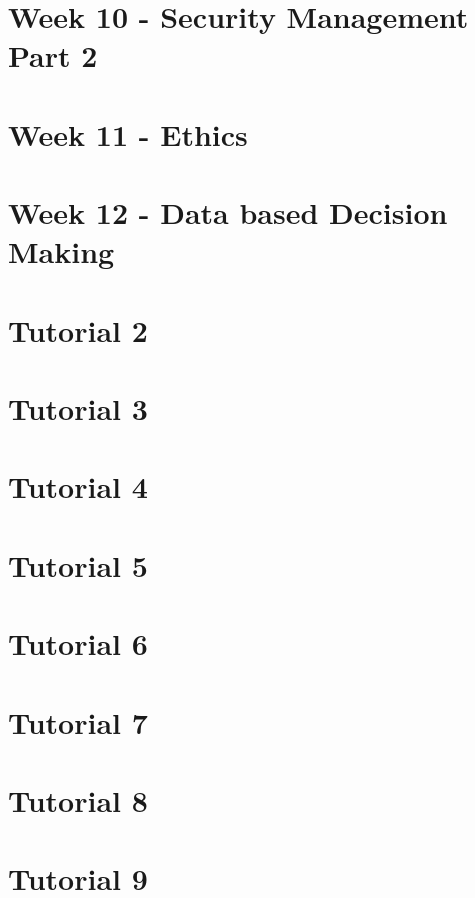 \documentclass[12pt]{article}
\begin{document}
\section{Week 10 - Security Management Part 2}

\pagebreak

\section{Week 11 - Ethics}

\pagebreak

\section{Week 12 - Data based Decision Making}

\pagebreak

\section{Tutorial 2}

\pagebreak

\section{Tutorial 3}

\pagebreak

\section{Tutorial 4}

\pagebreak

\section{Tutorial 5}

\pagebreak

\section{Tutorial 6}

\pagebreak

\section{Tutorial 7}

\pagebreak

\section{Tutorial 8}

\pagebreak

\section{Tutorial 9}

\pagebreak
\end{document}
